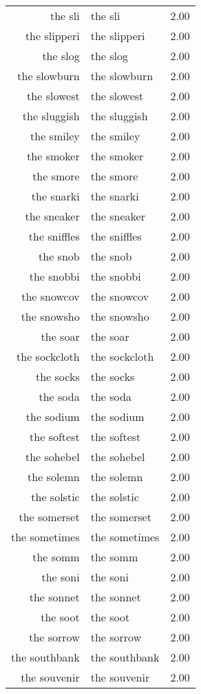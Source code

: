 \begin{table}[ht]
\begin{tabular}{rlr}
  the sli & the sli & 2.00 \\ 
  the slipperi & the slipperi & 2.00 \\ 
  the slog & the slog & 2.00 \\ 
  the slowburn & the slowburn & 2.00 \\ 
  the slowest & the slowest & 2.00 \\ 
  the sluggish & the sluggish & 2.00 \\ 
  the smiley & the smiley & 2.00 \\ 
  the smoker & the smoker & 2.00 \\ 
  the smore & the smore & 2.00 \\ 
  the snarki & the snarki & 2.00 \\ 
  the sneaker & the sneaker & 2.00 \\ 
  the sniffles & the sniffles & 2.00 \\ 
  the snob & the snob & 2.00 \\ 
  the snobbi & the snobbi & 2.00 \\ 
  the snowcov & the snowcov & 2.00 \\ 
  the snowsho & the snowsho & 2.00 \\ 
  the soar & the soar & 2.00 \\ 
  the sockcloth & the sockcloth & 2.00 \\ 
  the socks & the socks & 2.00 \\ 
  the soda & the soda & 2.00 \\ 
  the sodium & the sodium & 2.00 \\ 
  the softest & the softest & 2.00 \\ 
  the sohebel & the sohebel & 2.00 \\ 
  the solemn & the solemn & 2.00 \\ 
  the solstic & the solstic & 2.00 \\ 
  the somerset & the somerset & 2.00 \\ 
  the sometimes & the sometimes & 2.00 \\ 
  the somm & the somm & 2.00 \\ 
  the soni & the soni & 2.00 \\ 
  the sonnet & the sonnet & 2.00 \\ 
  the soot & the soot & 2.00 \\ 
  the sorrow & the sorrow & 2.00 \\ 
  the southbank & the southbank & 2.00 \\ 
  the souvenir & the souvenir & 2.00 \\ 

\end{tabular}
\end{table}
